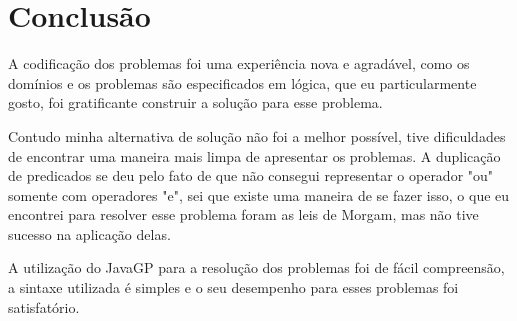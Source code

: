 \documentclass[letterpaper]{article}
\begin{document}
\section{Conclusão}

\noindent 
A codificação dos problemas foi uma experiência nova e agradável, como os domínios e os problemas são especificados em lógica, que eu particularmente gosto, foi gratificante construir a solução para esse problema. 

Contudo minha alternativa de solução não foi a melhor possível, tive dificuldades de encontrar uma maneira mais limpa de apresentar os problemas. A duplicação de predicados se deu pelo fato de que não consegui representar o operador "ou" somente com operadores "e", sei que existe uma maneira de se fazer isso, o que eu encontrei para resolver esse problema foram as leis de Morgam, mas não tive sucesso na aplicação delas.

A utilização do JavaGP para a resolução dos problemas foi de fácil compreensão, a sintaxe utilizada é simples e o seu desempenho para esses problemas foi satisfatório.
\end{document}
